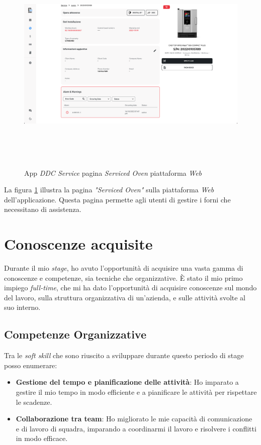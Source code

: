 \begin{figure}[H]
    \centering
    \includegraphics[alt={Screenshot della pagina \textit{"Serviced Oven"} su piattaforma \textit{Web}}, height=10cm]{img/ServicedOvenWeb}
    \caption{App \textit{DDC Service} pagina \textit{Serviced Oven} piattaforma \textit{Web}}
    \label{fig:servicedovenweb}
\end{figure}

La figura \ref{fig:servicedovenweb} illustra la pagina \textit{"Serviced Oven"} sulla piattaforma \textit{Web} dell'applicazione.
Questa pagina permette agli utenti di gestire i forni che necessitano di assistenza.
\section{Conoscenze acquisite}

Durante il mio \textit{stage}, ho avuto l'opportunità di acquisire una vasta gamma di conoscenze e competenze, sia tecniche che organizzative. È stato il mio primo impiego \textit{full-time}, che mi ha dato l'opportunità di acquisire conoscenze sul mondo del lavoro, sulla struttura organizzativa di un'azienda, e sulle attività svolte al suo interno.

\subsection{Competenze Organizzative}

Tra le \textit{soft skill} che sono riuscito a sviluppare durante questo periodo di stage posso enumerare:
\begin{itemize}
    \item \textbf{Gestione del tempo e pianificazione delle attività}: Ho imparato a gestire il mio tempo in modo efficiente e a pianificare le attività per rispettare le scadenze.
    \item \textbf{Collaborazione tra team}: Ho migliorato le mie capacità di comunicazione e di lavoro di squadra, imparando a coordinarmi il lavoro e risolvere i conflitti in modo efficace.
\end{itemize}

